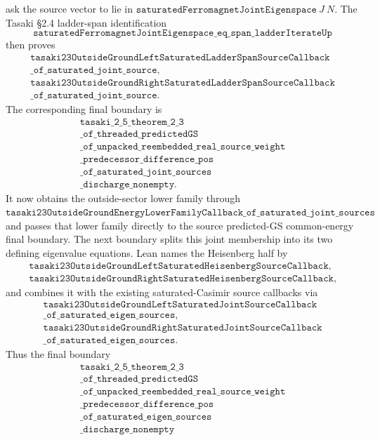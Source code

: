 \documentclass[a4paper,11pt]{article}
\begin{document}
ask the source vector to lie in
\(\texttt{saturatedFerromagnetJointEigenspace}\ J\ N\).  The Tasaki
\S2.4 ladder-span identification
\[
\texttt{saturatedFerromagnetJointEigenspace\_eq\_span\_ladderIterateUp}
\]
then proves
\[
\begin{gathered}
\texttt{tasaki23OutsideGroundLeftSaturatedLadderSpanSourceCallback}\\
\texttt{\_of\_saturated\_joint\_source},\\
\texttt{tasaki23OutsideGroundRightSaturatedLadderSpanSourceCallback}\\
\texttt{\_of\_saturated\_joint\_source}.
\end{gathered}
\]
The corresponding final boundary is
\[
\begin{gathered}
\texttt{tasaki\_2\_5\_theorem\_2\_3}\\
\texttt{\_of\_threaded\_predictedGS}\\
\texttt{\_of\_unpacked\_reembedded\_real\_source\_weight}\\
\texttt{\_predecessor\_difference\_pos}\\
\texttt{\_of\_saturated\_joint\_sources}\\
\texttt{\_discharge\_nonempty}.
\end{gathered}
\]
It now obtains the outside-sector lower family through
\(\texttt{tasaki23OutsideGroundEnergyLowerFamilyCallback\_of\_saturated\_joint\_sources}\)
and passes that lower family directly to the source predicted-GS common-energy
final boundary.
The next boundary splits this joint membership into its two defining
eigenvalue equations.  Lean names the Heisenberg half by
\[
\begin{gathered}
\texttt{tasaki23OutsideGroundLeftSaturatedHeisenbergSourceCallback},\\
\texttt{tasaki23OutsideGroundRightSaturatedHeisenbergSourceCallback},
\end{gathered}
\]
and combines it with the existing saturated-Casimir source callbacks via
\[
\begin{gathered}
\texttt{tasaki23OutsideGroundLeftSaturatedJointSourceCallback}\\
\texttt{\_of\_saturated\_eigen\_sources},\\
\texttt{tasaki23OutsideGroundRightSaturatedJointSourceCallback}\\
\texttt{\_of\_saturated\_eigen\_sources}.
\end{gathered}
\]
Thus the final boundary
\[
\begin{gathered}
\texttt{tasaki\_2\_5\_theorem\_2\_3}\\
\texttt{\_of\_threaded\_predictedGS}\\
\texttt{\_of\_unpacked\_reembedded\_real\_source\_weight}\\
\texttt{\_predecessor\_difference\_pos}\\
\texttt{\_of\_saturated\_eigen\_sources}\\
\texttt{\_discharge\_nonempty}
\end{gathered}
\]
\end{document}
